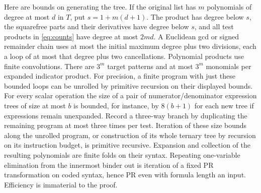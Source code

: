 Here are bounds on generating the tree. If the original list has $m$
polynomials of degree at most $d$ in $T$, put $s=1+m(d+1)$.
The product has degree below $s$, the squarefree parts and their
derivatives have degree below $s$, and all test products in
\eqref{eq:counts} have degree at most $2md$. A Euclidean gcd or signed
remainder chain uses at most the initial maximum degree plus two
divisions, each a loop of at most that degree plus two cancellations.
Polynomial products use finite convolutions. There are $3^m$ target
patterns and at most $3^m$ monomials per expanded indicator product.
For precision, a finite program with just these bounded loops can be
unrolled by primitive recursion on their displayed bounds. For every
scalar operation the size of a pair of numerator/denominator expression
trees of size at most $b$ is bounded, for instance, by $8(b+1)$ for
each new tree if expressions remain unexpanded. Record a three-way
branch by duplicating the remaining program at most three times per
test. Iteration of these size bounds along the unrolled program, or
construction of its whole ternary tree by recursion on its instruction
budget, is primitive recursive. Expansion and collection of the resulting
polynomials are finite folds on their syntax. Repeating one-variable
elimination from the innermost binder out is iteration of a fixed PR
transformation on coded syntax, hence PR even with formula length an
input. Efficiency is immaterial to the proof.

